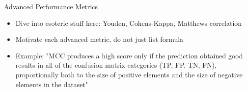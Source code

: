 \documentclass[11pt,compress,t,notes=noshow, aspectratio=169, xcolor=table]{beamer}
\begin{document}


\begin{frame}{Advanced Performance Metrics}

\begin{itemize}
\setlength\itemsep{2em}
    \item Dive into esoteric stuff here: Youden, Cohens-Kappa, Matthews correlation
    \item Motivate each advanced metric, do not just list formula
    \item Example: "MCC produces a high score only if the prediction obtained good results in all of the confusion matrix categories (TP, FP, TN, FN), proportionally both to the size of positive elements and the size of negative elements in the dataset"
\end{itemize}
\end{frame}



\endlecture
\end{document}
